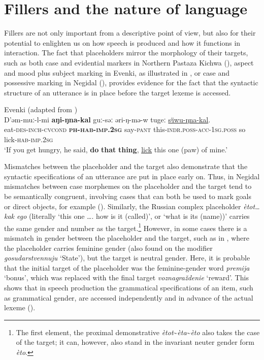 \documentclass[output=paper]{langscibook}
\begin{document}
\section{Fillers and the nature of language}\label{sec:intro:8}

Fillers are not only important from a descriptive point of view, but also for their potential to enlighten us on how speech is produced and how it functions in interaction. The fact that placeholders mirror the morphology of their targets, such as both case and evidential markers in Northern Pastaza Kichwa (\citealt{chapters/rice}), aspect and mood plus subject marking in Evenki, as illustrated in , or case and possessive marking in Negidal (\citealt{chapters/pakendorf}), provides evidence for the fact that the syntactic structure of an utterance is in place before the target lexeme is accessed. 

\ea\label{ex:intro:25}
{Evenki (adapted from \citealt[209]{Klyachko2022})}\\
\gll D'əm-muː-l-mi \textbf{aŋi-ŋna-kal} guː-səː əri-ŋ-mə-w tugeː \uline{sʲiwu-ŋna-kal}.\\
     eat-\textsc{des-inch-cvcond} \textbf{\textsc{ph-hab-imp.2sg}} say-\textsc{pant} this-\textsc{indr.poss-acc-1sg.poss} so lick-\textsc{hab-imp.2sg}\\
\glt ‘If you get hungry, he said, \textbf{do} \textbf{that} \textbf{thing}, \uline{lick} this one (paw) of mine.’
\z

Mismatches between the placeholder and the target also demonstrate that the syntactic specifications of an utterance are put in place early on. Thus, in Negidal mismatches between case morphemes on the placeholder and the target tend to be semantically congruent, involving cases that can both be used to mark goals or direct objects, for example (\citealt{chapters/pakendorf}). Similarly, the Russian complex placeholder \textit{ètot… kak ego} (literally ‘this one …. how is it (called)’, or ‘what is its (name))’ carries the same gender and number as the target.\footnote{The first element, the proximal demonstrative \textit{ètot}{\textasciitilde}\textit{èta}{\textasciitilde}\textit{èto} also takes the case of the target; it can, however, also stand in the invariant neuter gender form \textit{èto}.} However, in some cases there is a mismatch in gender between the placeholder and the target, such as in , where the placeholder carries feminine gender (also found on the modifier \textit{gosudarstvennuju} ‘State’), but the target is neutral gender. Here, it is probable that the initial target of the placeholder was the feminine-gender word \textit{premija} ‘bonus’, which was replaced with the final target \textit{voznagraždenie} ‘reward’. This shows that in speech production the grammatical specifications of an item, such as grammatical gender, are accessed independently and in advance of the actual lexeme (\citealt[68--69]{Podlesskaya2022}).
\end{document}
